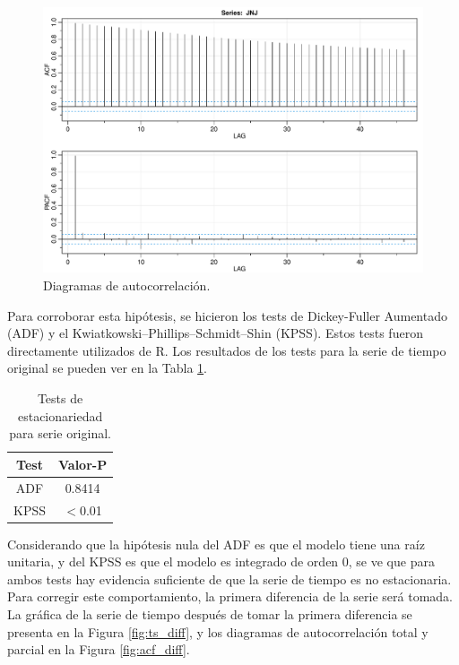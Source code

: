 \documentclass[conference]{IEEEtran}
\begin{document}
\begin{figure}
    \centering
    \includegraphics[width=\columnwidth]{figs/acf_og.pdf}
    \caption{Diagramas de autocorrelación.}
    \label{fig:acf_og}
\end{figure}

Para corroborar esta hipótesis, se hicieron los tests de Dickey-Fuller Aumentado (ADF) y el Kwiatkowski–Phillips–Schmidt–Shin (KPSS). Estos tests fueron directamente utilizados de R. Los resultados de los tests para la serie de tiempo original se pueden ver en la Tabla \ref{tab:estac_og}.

\begin{table}[H]
\centering
\caption{Tests de estacionariedad para serie original.}
\label{tab:estac_og}
\begin{tabular}{cc}
\hline
\textbf{Test} & \textbf{Valor-P} \\ \hline
ADF & 0.8414 \\
KPSS & $<$0.01 \\ \hline
\end{tabular}
\end{table}

Considerando que la hipótesis nula del ADF es que el modelo tiene una raíz unitaria, y del KPSS es que el modelo es integrado de orden 0, se ve que para ambos tests hay evidencia suficiente de que la serie de tiempo es no estacionaria. Para corregir este comportamiento, la primera diferencia de la serie será tomada. La gráfica de la serie de tiempo después de tomar la primera diferencia se presenta en la Figura \ref{fig:ts_diff}, y los diagramas de autocorrelación total y parcial en la Figura \ref{fig:acf_diff}.
\end{document}

